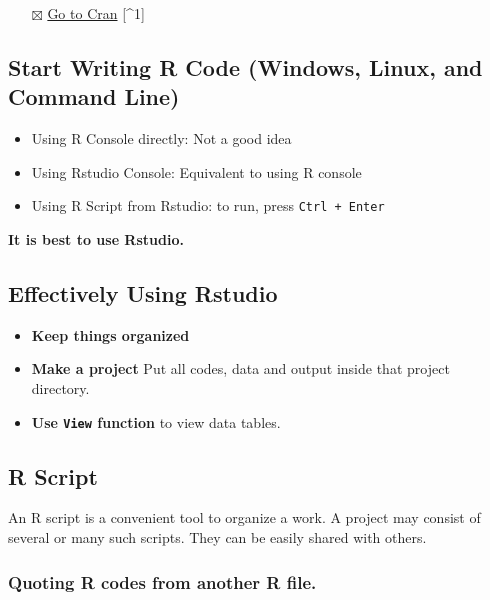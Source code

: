 \documentclass[
]{book}
\providecommand{\tightlist}{%
  \setlength{\itemsep}{0pt}\setlength{\parskip}{0pt}}
\begin{document}
\begin{itemize}
\tightlist
\item[$\boxtimes$]
  \href{https://cran.r-project.org}{Go to Cran} {[}\^{}1{]}
\end{itemize}

\hypertarget{start-writing-r-code-windows-linux-and-command-line}{%
\subsection{Start Writing R Code (Windows, Linux, and Command Line)}\label{start-writing-r-code-windows-linux-and-command-line}}

\begin{itemize}
\tightlist
\item
  Using R Console directly: Not a good idea
\item
  Using Rstudio Console: Equivalent to using R console
\item
  Using R Script from Rstudio: to run, press \texttt{Ctrl\ +\ Enter}
\end{itemize}

\textbf{It is best to use Rstudio.}

\hypertarget{effectively-using-rstudio}{%
\subsection{Effectively Using Rstudio}\label{effectively-using-rstudio}}

\begin{itemize}
\tightlist
\item
  \textbf{Keep things organized}
\item
  \textbf{Make a project} Put all codes, data and output inside that project directory.
\item
  \textbf{Use \texttt{View} function} to view data tables.
\end{itemize}

\hypertarget{r-script}{%
\subsection{R Script}\label{r-script}}

An R script is a convenient tool to organize a work. A project may consist of several or many such scripts. They can be easily shared with others.

\hypertarget{quoting-r-codes-from-another-r-file.}{%
\subsubsection{Quoting R codes from another R file.}\label{quoting-r-codes-from-another-r-file.}}
\end{document}
